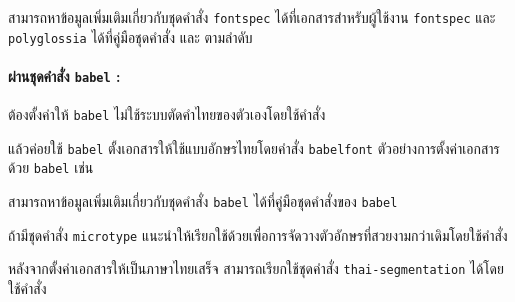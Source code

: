 สามารถหาข้อมูลเพิ่มเติมเกี่ยวกับชุดคำสั่ง \texttt{fontspec}
ได้ที่เอกสารสำหรับผู้ใช้งาน \texttt{fontspec} และ \texttt{polyglossia}
ได้ที่คู่มือชุดคำสั่ง \parencite{fontspec-docs} และ \parencite{polyglossia-docs}
ตามลำดับ

\paragraph{ผ่านชุดคำสั่ง \texttt{babel} :}

ต้องตั้งค่าให้ \texttt{babel} ไม่ใช้ระบบตัดคำไทยของตัวเองโดยใช้คำสั่ง

\begin{texsource}{}
\end{texsource}

แล้วค่อยใช้ \texttt{babel} ตั้งเอกสารให้ใช้แบบอักษรไทยโดยคำสั่ง
\texttt{babelfont} ตัวอย่างการตั้งค่าเอกสารด้วย \texttt{babel} เช่น

\begin{texsource}{}
\usepackage[thai,english]{babel}
\usepackage[hyphenrules=nohyphenation]{thai} %
\end{texsource}

สามารถหาข้อมูลเพิ่มเติมเกี่ยวกับชุดคำสั่ง \texttt{babel}
ได้ที่คู่มือชุดคำสั่งของ \texttt{babel} \parencite{babel-docs}

ถ้ามีชุดคำสั่ง \texttt{microtype}
แนะนำให้เรียกใช้ด้วยเพื่อการจัดวางตัวอักษรที่สวยงามกว่าเดิมโดยใช้คำสั่ง

\begin{texsource}{}
\usepackage[protrusion=true,expansion=true,tracking=true]{microtype}
\end{texsource}

หลังจากตั้งค่าเอกสารให้เป็นภาษาไทยเสร็จ สามารถเรียกใช้ชุดคำสั่ง
\texttt{thai-segmentation} ได้โดยใช้คำสั่ง

